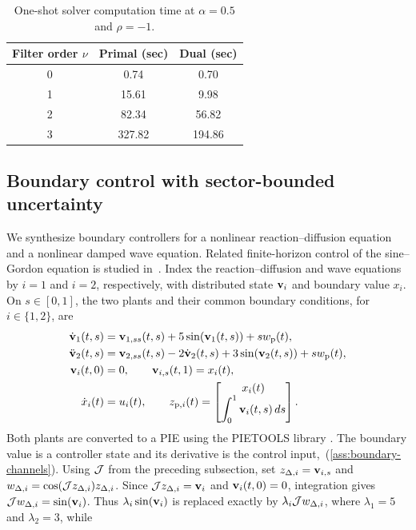 \begin{table}[t]
 \centering
 \caption{One-shot solver computation time at $\alpha=0.5$ and $\rho=-1$.}
 \label{tab:coupled-heat-timing}
 \begin{tabular}{@{}ccc@{}}
  \toprule
  Filter order $\nu$ & Primal (sec) & Dual (sec)\\
  \midrule
  0 & 0.74 & 0.70\\
  1 & 15.61 & 9.98\\
  2 & 82.34 & 56.82\\
  3 & 327.82 & 194.86\\
  \bottomrule
 \end{tabular}
\end{table}


\subsection{Boundary control with sector-bounded uncertainty}
\label{ex:sector-pdes}
We synthesize boundary controllers for a nonlinear reaction--diffusion
equation and a nonlinear damped wave equation.
Related finite-horizon control of the sine--Gordon equation is studied
in~\cite{petcu2004control}. Index the reaction--diffusion and wave equations
by $i=1$ and $i=2$, respectively, with distributed state $\mathbf{v}_i$ and
boundary value $x_i$. On $s\in[0,1]$, the two plants and their common
boundary conditions, for $i\in\{1,2\}$, are
\begin{align*}
 \dot{\mathbf{v}}_1(t,s)&=\mathbf{v}_{1,ss}(t,s)+5\sin(\mathbf{v}_1(t,s))+s w_{{\mathrm{p}}}(t),\\
 \ddot{\mathbf{v}}_2(t,s)&=\mathbf{v}_{2,ss}(t,s)-2\dot{\mathbf{v}}_2(t,s)
                   +3\sin(\mathbf{v}_2(t,s))+s w_{{\mathrm{p}}}(t),\\
 \mathbf{v}_i(t,0)&=0,\qquad \mathbf{v}_{i,s}(t,1)=x_i(t),\\
 \dot x_i(t)&=u_i(t),\qquad
 z_{{{\mathrm{p}}},i}(t)=\begin{bmatrix}x_i(t)\\\displaystyle\int_0^1\mathbf{v}_i(t,s)\,ds\end{bmatrix}.
\end{align*}
Both plants are converted to a PIE using the PIETOOLS library \cite{pietools2025manual}. The boundary
value is a controller state and its derivative is the control
input,~(\ref{ass:boundary-channels}). 
Using $\mathcal{J}$ from the preceding subsection, set $z_{\Delta,i}=\mathbf{v}_{i,s}$ and
$w_{\Delta,i}=\cos(\mathcal{J}z_{\Delta,i})z_{\Delta,i}$. Since
$\mathcal{J}z_{\Delta,i}=\mathbf{v}_i$ and $\mathbf{v}_i(t,0)=0$, integration gives
$\mathcal{J}w_{\Delta,i}=\sin(\mathbf{v}_i)$. Thus $\lambda_i\sin(\mathbf{v}_i)$ is replaced
exactly by $\lambda_i\mathcal{J}w_{\Delta,i}$, where $\lambda_1=5$ and $\lambda_2=3$, while
